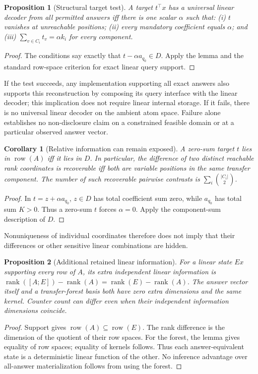 \documentclass[10pt]{article}
\newtheorem{proposition}{Proposition}
\newtheorem{corollary}{Corollary}
\newcommand{\row}{\operatorname{row}}
\newcommand{\rank}{\operatorname{rank}}
\begin{document}
\begin{proposition}[Structural target test]
A target $t^\top x$ has a universal linear decoder from all permitted answers
iff there is one scalar $\alpha$ such that: (i) $t$ vanishes at unreachable
positions; (ii) every mandatory coefficient equals $\alpha$; and (iii)
$\sum_{v\in C_i}t_v=\alpha k_i$ for every component.
\end{proposition}
\begin{proof}
The conditions say exactly that $t-\alpha a_{q_0}\in D$. Apply the lemma and
the standard row-space criterion for exact linear query support.
\end{proof}
\noindent If the test succeeds, any implementation supporting all exact answers
also supports this reconstruction by composing its query interface with the
linear decoder; this implication does not require linear internal storage.
If it fails, there is no universal linear decoder on the ambient atom space.
Failure alone establishes no non-disclosure claim on a constrained feasible
domain or at a particular observed answer vector.

\begin{corollary}[Relative information can remain exposed]
A zero-sum target $t$ lies in $\row(A)$ iff it lies in $D$. In particular, the
difference of two distinct reachable rank coordinates is recoverable iff both
are variable positions in the same transfer component. The number of such
recoverable pairwise contrasts is $\sum_i\binom{|C_i|}{2}$.
\end{corollary}
\begin{proof}
In $t=z+\alpha a_{q_0}$, $z\in D$ has total coefficient sum zero, while
$a_{q_0}$ has total sum $K>0$. Thus a zero-sum $t$ forces $\alpha=0$.
Apply the component-sum description of $D$.
\end{proof}
\noindent Nonuniqueness of individual coordinates therefore does not imply
that their differences or other sensitive linear combinations are hidden.

\begin{proposition}[Additional retained linear information]
For a linear state $Ex$ supporting every row of $A$, its extra independent
linear information is $\rank([A;E])-\rank(A)=\rank(E)-\rank(A)$.
The answer vector itself and a transfer-forest basis both have zero extra
dimensions and the same kernel. Counter count can differ even when their
independent information dimensions coincide.
\end{proposition}
\begin{proof}
Support gives $\row(A)\subseteq\row(E)$. The rank difference is the dimension
of the quotient of their row spaces. For the forest, the lemma gives equality
of row spaces; equality of kernels follows. Thus each answer-equivalent state
is a deterministic linear function of the other. No inference advantage over
all-answer materialization follows from using the forest.
\end{proof}
\end{document}
